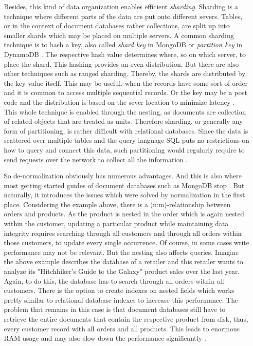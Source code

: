 Besides, this kind of data organization enables efficient \emph{sharding}. Sharding is a technique where different parts of the data are put onto different severs. Tables, or in the context of document databases rather collections, are split up into smaller shards which may be placed on multiple servers. A common sharding technique is to hash a key, also called \emph{shard key} in MongoDB \cite{MongoDBShardKey} or \emph{partition key} in DynamoDB \cite{DynamoDBPartitionKey}. The respective hash value determines where, so on which server, to place the shard. This hashing provides an even distribution. But there are also other techniques such as ranged sharding. Thereby, the shards are distributed by the key value itself. This may be useful, when the records have some sort of order and it is common to access multiple sequential records. Or the key may be a post code and the distribution is based on the sever location to minimize latency \cite{NoSQLDistilled}. This whole technique is enabled through the nesting, as documents are collection of related objects that are treated as units. Therefore sharding, or generally any form of partitioning, is rather difficult with relational databases. Since the data is scattered over multiple tables and the query language SQL puts no restrictions on how to query and connect this data, such partitioning would regularly require to send requests over the network to collect all the information \cite{NoSQLDistilled}.\par 
So de-normalization obviously has numerous advantages. And this is also where most getting started guides of document databases such as MongoDB stop \cite{MongoDBGettingStarted}. But naturally, it introduces the issues which were solved by normalization in the first place. Considering the example above, there is a (n:m)-relationship between orders and products. As the product is nested in the order which is again nested within the customer, updating a particular product while maintaining data integrity requires searching through all customers and through all orders within those customers, to update every single occurrence. Of course, in some cases write performance may not be relevant. But the nesting also affects queries. Imagine the above example describes the database of a retailer and this retailer wants to analyze its "Hitchhiker's Guide to the Galaxy" product sales over the last year. Again, to do this, the database has to search through all orders within all customers. There is the option to create indexes on nested fields which works pretty similar to relational database indexes to increase this performance. The problem that remains in this case is that document databases still have to retrieve the entire documents that contain the respective product from disk, thus, every customer record with all orders and all products. This leads to enormous RAM usage and may also slow down the performance significantly \cite{MongoDBAppliedDesign}.\\\\
